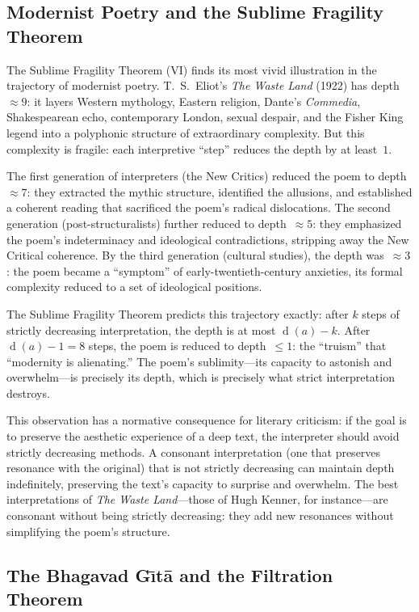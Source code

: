 \documentclass[11pt,openany]{book}
\theoremstyle{definition}
\theoremstyle{plain}
\theoremstyle{remark}
\newcommand{\depth}{\operatorname{d}}       %
\begin{document}
\subsection{Modernist Poetry and the Sublime Fragility Theorem}

The Sublime Fragility Theorem (VI) finds its most vivid illustration in the trajectory of modernist poetry. T.~S.~Eliot's \emph{The Waste Land} (1922) has depth~$\approx 9$: it layers Western mythology, Eastern religion, Dante's \emph{Commedia}, Shakespearean echo, contemporary London, sexual despair, and the Fisher King legend into a polyphonic structure of extraordinary complexity. But this complexity is fragile: each interpretive ``step'' reduces the depth by at least~$1$.

The first generation of interpreters (the New Critics) reduced the poem to depth~$\approx 7$: they extracted the mythic structure, identified the allusions, and established a coherent reading that sacrificed the poem's radical dislocations. The second generation (post-structuralists) further reduced to depth~$\approx 5$: they emphasized the poem's indeterminacy and ideological contradictions, stripping away the New Critical coherence. By the third generation (cultural studies), the depth was~$\approx 3$: the poem became a ``symptom'' of early-twentieth-century anxieties, its formal complexity reduced to a set of ideological positions.

The Sublime Fragility Theorem predicts this trajectory exactly: after $k$ steps of strictly decreasing interpretation, the depth is at most $\depth(a) - k$. After $\depth(a) - 1 = 8$ steps, the poem is reduced to depth~$\leq 1$: the ``truism'' that ``modernity is alienating.'' The poem's sublimity---its capacity to astonish and overwhelm---is precisely its depth, which is precisely what strict interpretation destroys.

This observation has a normative consequence for literary criticism: if the goal is to preserve the aesthetic experience of a deep text, the interpreter should avoid strictly decreasing methods. A consonant interpretation (one that preserves resonance with the original) that is not strictly decreasing can maintain depth indefinitely, preserving the text's capacity to surprise and overwhelm. The best interpretations of \emph{The Waste Land}---those of Hugh Kenner, for instance---are consonant without being strictly decreasing: they add new resonances without simplifying the poem's structure.

\subsection{The Bhagavad G\=\i t\=a and the Filtration Theorem}
\end{document}
